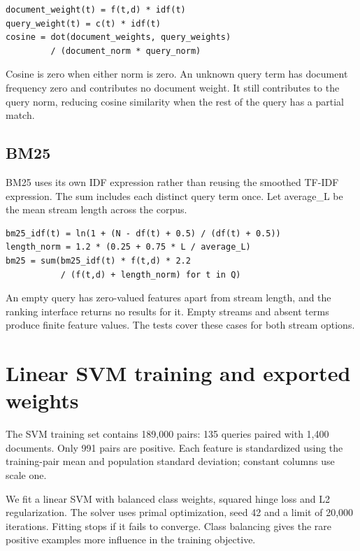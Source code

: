 \documentclass[12pt,a4paper]{article}
\begin{document}
\begin{small}\begin{verbatim}
document_weight(t) = f(t,d) * idf(t)
query_weight(t) = c(t) * idf(t)
cosine = dot(document_weights, query_weights)
         / (document_norm * query_norm)
\end{verbatim}\end{small}
Cosine is zero when either norm is zero. An unknown query term has document frequency zero and contributes no document weight. It still contributes to the query norm, reducing cosine similarity when the rest of the query has a partial match.

\subsection{BM25}
BM25 uses its own IDF expression rather than reusing the smoothed TF-IDF expression. The sum includes each distinct query term once. Let average\_L be the mean stream length across the corpus.

\begin{small}\begin{verbatim}
bm25_idf(t) = ln(1 + (N - df(t) + 0.5) / (df(t) + 0.5))
length_norm = 1.2 * (0.25 + 0.75 * L / average_L)
bm25 = sum(bm25_idf(t) * f(t,d) * 2.2
           / (f(t,d) + length_norm) for t in Q)
\end{verbatim}\end{small}
An empty query has zero-valued features apart from stream length, and the ranking interface returns no results for it. Empty streams and absent terms produce finite feature values. The tests cover these cases for both stream options.

\section{Linear SVM training and exported weights}
The SVM training set contains 189,000 pairs: 135 queries paired with 1,400 documents. Only 991 pairs are positive. Each feature is standardized using the training-pair mean and population standard deviation; constant columns use scale one.

We fit a linear SVM with balanced class weights, squared hinge loss and L2 regularization. The solver uses primal optimization, seed 42 and a limit of 20,000 iterations. Fitting stops if it fails to converge. Class balancing gives the rare positive examples more influence in the training objective.
\end{document}
